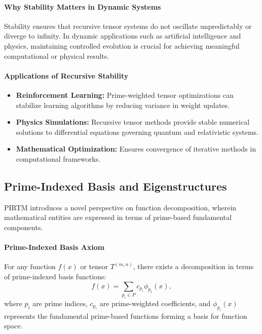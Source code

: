 \documentclass{article}
\theoremstyle{plain}
\begin{document}
\paragraph{Why Stability Matters in Dynamic Systems}
Stability ensures that recursive tensor systems do not oscillate unpredictably or diverge to infinity. In dynamic applications such as artificial intelligence and physics, maintaining controlled evolution is crucial for achieving meaningful computational or physical results.

\paragraph{Applications of Recursive Stability}
\begin{itemize}
    \item \textbf{Reinforcement Learning:} Prime-weighted tensor optimizations can stabilize learning algorithms by reducing variance in weight updates.
    \item \textbf{Physics Simulations:} Recursive tensor methods provide stable numerical solutions to differential equations governing quantum and relativistic systems.
    \item \textbf{Mathematical Optimization:} Ensures convergence of iterative methods in computational frameworks.
\end{itemize}

\subsection{Prime-Indexed Basis and Eigenstructures}

PIRTM introduces a novel perspective on function decomposition, wherein mathematical entities are expressed in terms of prime-based fundamental components.

\paragraph{Prime-Indexed Basis Axiom}
For any function \( f(x) \) or tensor \( T^{(m,n)} \), there exists a decomposition in terms of prime-indexed basis functions:
\begin{equation}
    f(x) = \sum_{p_i \in P} c_{p_i} \phi_{p_i}(x),
\end{equation}
where \( p_i \) are prime indices, \( c_{p_i} \) are prime-weighted coefficients, and \( \phi_{p_i}(x) \) represents the fundamental prime-based functions forming a basis for function space.
\end{document}
